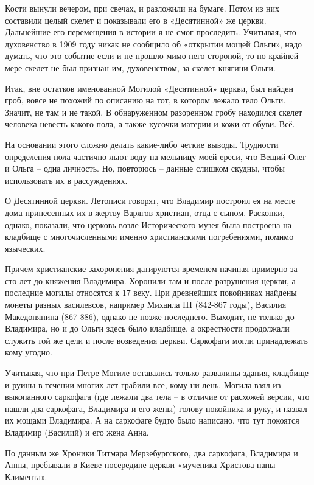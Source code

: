 Кости вынули вечером, при свечах, и разложили на бумаге. Потом из них составили целый скелет и показывали его в «Десятинной» же церкви. Дальнейшие его перемещения в истории я не смог проследить. Учитывая, что духовенство в 1909 году никак не сообщило об «открытии мощей Ольги», надо думать, что это событие если и не прошло мимо него стороной, то по крайней мере скелет не был признан им, духовенством, за скелет княгини Ольги.

Итак, вне остатков именованной Могилой «Десятинной» церкви, был найден гроб, вовсе не похожий по описанию на тот, в котором лежало тело Ольги. Значит, не там и не такой. В обнаруженном разоренном гробу находился скелет человека невесть какого пола, а также кусочки материи и кожи от обуви. Всё. 

На основании этого сложно делать какие-либо четкие выводы. Трудности определения пола частично льют воду на мельницу моей ереси, что Вещий Олег и Ольга – одна личность. Но, повторюсь – данные слишком скудны, чтобы использовать их в рассуждениях.


О Десятинной церкви. Летописи говорят, что Владимир построил ея на месте дома принесенных их в жертву Варягов-христиан, отца с сыном. Раскопки, однако, показали, что церковь возле Исторического музея была построена на кладбище с многочисленными именно христианскими погребениями, помимо языческих.

Причем христианские захоронения датируются временем начиная примерно за сто лет до княжения Владимира. Хоронили там и после разрушения церкви, а последние могилы относятся к 17 веку. При древнейших покойниках найдены монеты  разных василевсов, например Михаила III (842-867 годы), Василия Македонянина (867-886), однако не позже последнего. Выходит, не только до Владимира, но и до Ольги здесь было кладбище, а окрестности продолжали служить той же цели и после возведения церкви. Саркофаги могли принадлежать кому угодно. 

Учитывая, что при Петре Могиле оставались только развалины здания, кладбище и руины в течении многих лет грабили все, кому ни лень. Могила взял из выкопанного саркофага (где лежали два тела – в отличие от расхожей версии, что нашли два саркофага, Владимира и его жены) голову покойника и руку, и назвал их мощами Владимира. А на саркофаге будто было написано, что тут покоятся Владимир (Василий) и его жена Анна.

По данным же Хроники Титмара Мерзебургского, два саркофага, Владимира и Анны, пребывали в Киеве посередине церкви «мученика Христова папы Климента».

